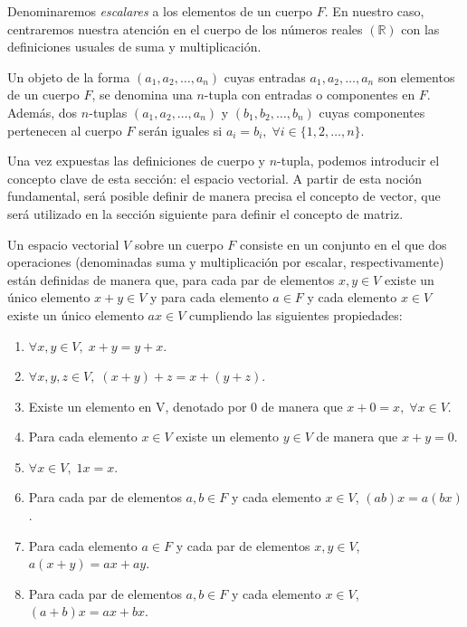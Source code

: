 Denominaremos \emph{escalares} a los elementos de un cuerpo $F$. En nuestro caso, centraremos nuestra atención en el cuerpo de los números reales $(\mathbb{R})$ con las definiciones usuales de suma y multiplicación.\newline

\begin{definicion}
    Un objeto de la forma $(a_{1}, a_{2}, \ldots, a_{n})$ cuyas entradas $a_{1}, a_{2}, \ldots, a_{n}$ son elementos de un cuerpo $F$, se denomina una $n$-tupla con entradas o componentes en $F$. Además, dos $n$-tuplas $(a_{1}, a_{2}, \ldots, a_{n})$ y $(b_{1}, b_{2}, \ldots, b_{n})$ cuyas componentes pertenecen al cuerpo $F$ serán iguales si $a_{i} = b_{i}, \; \forall i \in \{1,2, \ldots, n\}$.\newline
\end{definicion}

Una vez expuestas las definiciones de cuerpo y $n$-tupla, podemos introducir el concepto clave de esta sección: el espacio vectorial. A partir de esta noción fundamental, será posible definir de manera precisa el concepto de vector, que será utilizado en la sección siguiente para definir el concepto de matriz.\newline

\begin{definicion}
    Un espacio vectorial $V$ sobre un cuerpo $F$ consiste en un conjunto en el que dos operaciones (denominadas suma y multiplicación por escalar, respectivamente) están definidas de manera que, para cada par de elementos $x, y \in V$ existe un único elemento $x+y \in V$ y para cada elemento $a \in F$ y cada elemento $x \in V$ existe un único elemento $ax \in V$ cumpliendo las siguientes propiedades:

    \begin{enumerate}
        \item $\forall x,y \in V, \; x+y=y+x$.
        \item $\forall x,y,z \in V, \; (x+y)+z=x+(y+z)$.
        \item Existe un elemento en V, denotado por $0$ de manera que $x+0=x, \; \forall x \in V$.
        \item Para cada elemento $x \in V$ existe un elemento $y \in V$ de manera que $x+y=0$.
        \item $\forall x \in V, \; 1x = x$.
        \item Para cada par de elementos $a,b \in F$ y cada elemento $x \in V$, \; $(ab)x = a(bx)$.
        \item Para cada elemento $a \in F$ y cada par de elementos $x,y \in V$, \; $a(x+y) = ax + ay$.
        \item Para cada par de elementos $a,b \in F$ y cada elemento $x \in V$, \; $(a+b)x = ax+bx$.
    \end{enumerate}
\end{definicion}

